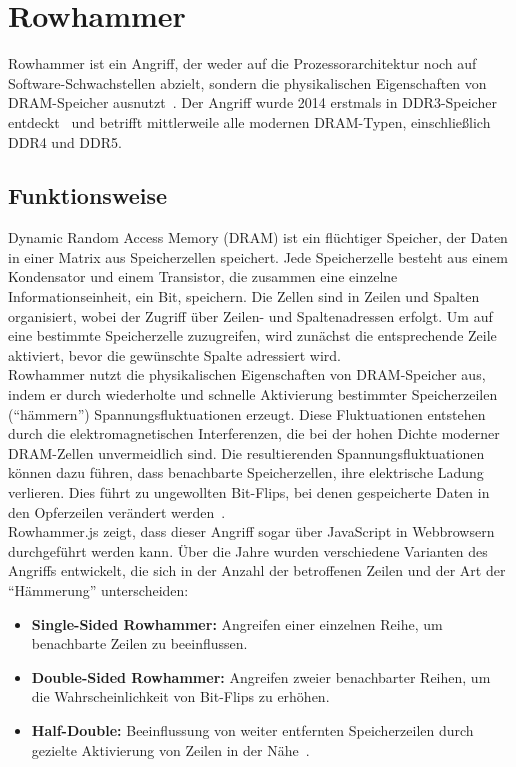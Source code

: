 \section{Rowhammer}
\label{sec:rowhammer}
Rowhammer ist ein Angriff, der weder auf die Prozessorarchitektur noch auf Software-Schwachstellen abzielt, sondern die physikalischen Eigenschaften von DRAM-Speicher ausnutzt~\cite{mutlu2019rowhammer}.
Der Angriff wurde 2014 erstmals in DDR3-Speicher entdeckt~\cite{kim2014flipping} und betrifft mittlerweile alle modernen DRAM-Typen, einschließlich DDR4 und DDR5.

\subsection{Funktionsweise}
\label{subsec:rowhammer_funktionsweise}
Dynamic Random Access Memory (DRAM) ist ein flüchtiger Speicher, der Daten in einer Matrix aus Speicherzellen speichert.
Jede Speicherzelle besteht aus einem Kondensator und einem Transistor, die zusammen eine einzelne Informationseinheit, ein Bit, speichern.
Die Zellen sind in Zeilen und Spalten organisiert, wobei der Zugriff über Zeilen- und Spaltenadressen erfolgt.
Um auf eine bestimmte Speicherzelle zuzugreifen, wird zunächst die entsprechende Zeile aktiviert, bevor die gewünschte Spalte adressiert wird. \\
Rowhammer nutzt die physikalischen Eigenschaften von DRAM-Speicher aus, indem er durch wiederholte und schnelle Aktivierung bestimmter Speicherzeilen (\enquote{hämmern}) Spannungsfluktuationen erzeugt.
Diese Fluktuationen entstehen durch die elektromagnetischen Interferenzen, die bei der hohen Dichte moderner DRAM-Zellen unvermeidlich sind.
Die resultierenden Spannungsfluktuationen können dazu führen, dass benachbarte Speicherzellen, ihre elektrische Ladung verlieren.
Dies führt zu ungewollten Bit-Flips, bei denen gespeicherte Daten in den Opferzeilen verändert werden~\cite{mutlu2019rowhammer}. \\
Rowhammer.js zeigt, dass dieser Angriff sogar über JavaScript in Webbrowsern durchgeführt werden kann.
Über die Jahre wurden verschiedene Varianten des Angriffs entwickelt, die sich in der Anzahl der betroffenen Zeilen und der Art der \enquote{Hämmerung} unterscheiden:
\begin{itemize}
	\itemsep0em
	\item \textbf{Single-Sided Rowhammer:} Angreifen einer einzelnen Reihe, um benachbarte Zeilen zu beeinflussen.
	\item \textbf{Double-Sided Rowhammer:} Angreifen zweier benachbarter Reihen, um die Wahrscheinlichkeit von Bit-Flips zu erhöhen.
	\item \textbf{Half-Double:} Beeinflussung von weiter entfernten Speicherzeilen durch gezielte Aktivierung von Zeilen in der Nähe~\cite{qazi2021half_double}.
\end{itemize}

